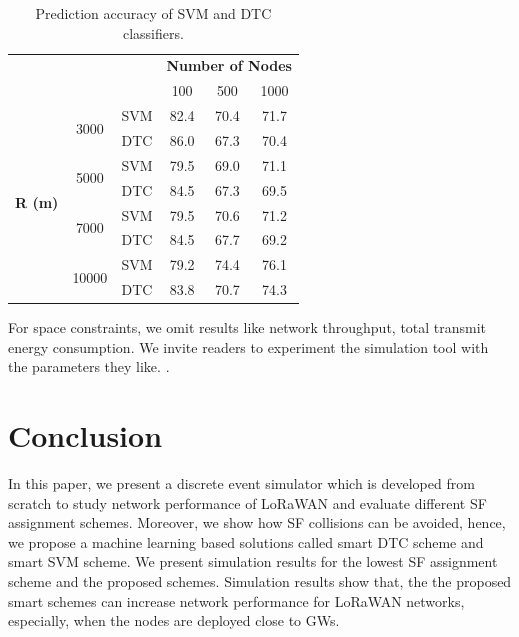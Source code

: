 \documentclass[conference]{IEEEtran}
\begin{document}
\begin{table}
\centering
\caption{Prediction accuracy of SVM and DTC classifiers.}
\label{table:prediction_accuracy}
\begin{tabular}{|c|c|c|c|c|c|}
\hline
\multicolumn{3}{|c|}{\multirow{2}{*}{}}                        & \multicolumn{3}{c|}{\textbf{Number of Nodes}} \\ \cline{4-6}
\multicolumn{3}{|c|}{}                                         & 100           & 500           & 1000          \\ \hline
\multirow{8}{*}{\textbf{R (m)}} & \multirow{2}{*}{3000}  & SVM & 82.4          & 70.4          & 71.7          \\ \cline{3-6}
                                &                        & DTC & 86.0          & 67.3          & 70.4          \\ \cline{2-6}

                                & \multirow{2}{*}{5000}  & SVM & 79.5          & 69.0          & 71.1          \\ \cline{3-6}
                                &                        & DTC & 84.5          & 67.3          & 69.5          \\ \cline{2-6}

                                & \multirow{2}{*}{7000}  & SVM & 79.5          & 70.6          & 71.2          \\ \cline{3-6}
                                &                        & DTC & 84.5          & 67.7          & 69.2          \\ \cline{2-6}

                                & \multirow{2}{*}{10000} & SVM & 79.2          & 74.4          & 76.1          \\ \cline{3-6}
                                &                        & DTC & 83.8          & 70.7          & 74.3          \\ \hline
\end{tabular}
\end{table}

\par For space constraints, we omit results like network throughput, total transmit energy consumption. We invite readers to experiment the simulation tool with the parameters they like. \cite{simlorasf}.


\section{Conclusion} \label{Conclusion}
\par In this paper, we present a discrete event simulator which is developed from scratch to study network performance of LoRaWAN and evaluate different SF assignment schemes. Moreover, we show how SF collisions can be avoided, hence, we propose a machine learning based solutions called smart DTC scheme and smart SVM scheme. We present simulation results for the lowest SF assignment scheme and the proposed schemes. Simulation results show that, the the proposed smart schemes can increase network performance for LoRaWAN networks, especially, when the nodes are deployed close to GWs.
\end{document}
